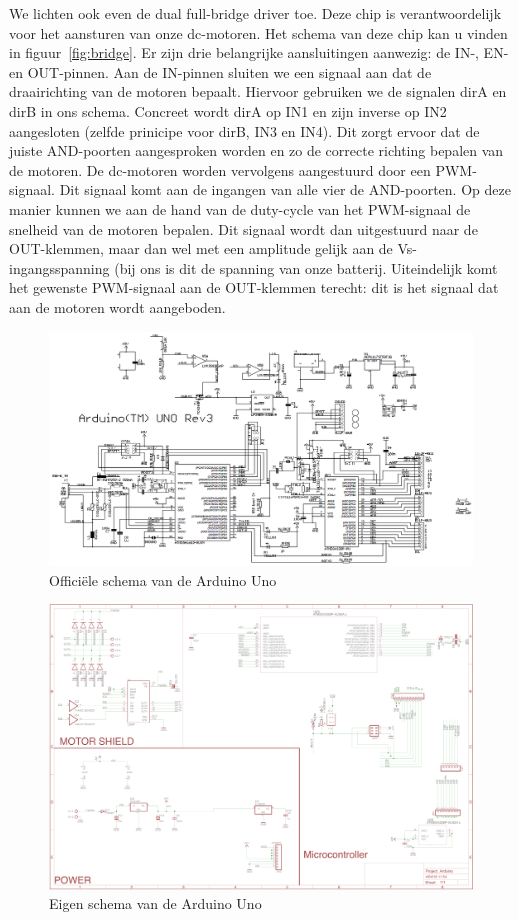 We lichten ook even de dual full-bridge driver toe. Deze chip is verantwoordelijk voor het aansturen van onze dc-motoren. Het schema van deze chip kan u vinden in figuur~\vref{fig:bridge}. Er zijn drie belangrijke aansluitingen aanwezig: de IN-, EN- en OUT-pinnen. Aan de IN-pinnen sluiten we een signaal aan dat de draairichting van de motoren bepaalt. Hiervoor gebruiken we de signalen dirA en dirB in ons schema. Concreet wordt dirA op IN1 en zijn inverse op IN2 aangesloten (zelfde prinicipe voor dirB, IN3 en IN4). Dit zorgt ervoor dat de juiste AND-poorten aangesproken worden en zo de correcte richting bepalen van de motoren. De dc-motoren worden vervolgens aangestuurd door een PWM-signaal. Dit signaal komt aan de ingangen van alle vier de AND-poorten. Op deze manier kunnen we aan de hand van de duty-cycle van het PWM-signaal de snelheid van de motoren bepalen. Dit signaal wordt dan uitgestuurd naar de OUT-klemmen, maar dan wel met een amplitude gelijk aan de Vs-ingangsspanning (bij ons is dit de spanning van onze batterij. Uiteindelijk komt het gewenste PWM-signaal aan de OUT-klemmen terecht: dit is het signaal dat aan de motoren wordt aangeboden. 

\begin{figure}[H]
	\centering
	\includegraphics[width=\textheight, angle=90]{arduino-uno-r3-schematic.png}
	\caption{Offici\"{e}le schema van de Arduino Uno\label{fig:ardsch}}
\end{figure}

\begin{figure}[H]
	\centering
	\includegraphics[width=\textheight, angle=90]{eigenschematic.png}
	\caption{Eigen schema van de Arduino Uno\label{fig:eigensch}}
\end{figure}

